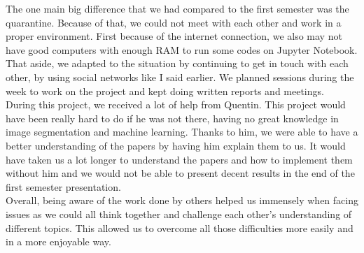 The one main big difference that we had compared to the first semester was 
the quarantine. Because of that, we could not meet with each other and work 
in a proper environment. First because of the internet connection, we also 
may not have good computers with enough RAM to run some codes on Jupyter Notebook. 
That aside, we adapted to the situation by continuing to get in touch with each 
other, by using social networks like I said earlier. We planned sessions 
during the week to work on the project and kept doing written reports and meetings.\\

During this project, we received a lot of help from Quentin. This project would
have been really hard to do if he was not there, having no great knowledge in
image segmentation and machine learning. Thanks to him, we were able to have a
better understanding of the papers by having him explain them to us. It would have taken us
a lot longer to understand the papers and how to implement them without him and we would 
not be able to present decent results in the end of the first semester presentation.\\

Overall, being aware of the work done by others helped us immensely when
facing issues as we could all think together and challenge each other's
understanding of different topics. This allowed us to overcome all those
difficulties more easily and in a more enjoyable way. 

